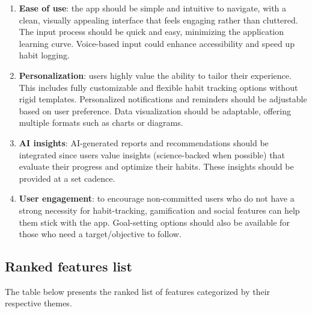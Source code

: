 \documentclass{article}
\begin{document}
\begin{enumerate}

    \item \textbf{Ease of use}: the app should be simple and intuitive to navigate, with a clean, visually appealing interface that feels engaging rather than cluttered. The input process should be quick and easy, minimizing the application learning curve. Voice-based input could enhance accessibility and speed up habit logging.

    \item \textbf{Personalization}: users highly value the ability to tailor their experience. This includes fully customizable and flexible habit tracking options without rigid templates. Personalized notifications and reminders should be adjustable based on user preference. Data visualization should be adaptable, offering multiple formats such as charts or diagrams.

    \item \textbf{AI insights}: AI-generated reports and recommendations should be integrated since users value insights (science-backed when possible) that evaluate their progress and optimize their habits. These insights should be provided at a set cadence.

    \item \textbf{User engagement}: to encourage non-committed users who do not have a strong necessity for habit-tracking, gamification and social features can help them stick with the app. Goal-setting options should also be available for those who need a target/objective to follow.

\end{enumerate}

\subsection{Ranked features list}

The table below presents the ranked list of features categorized by their respective themes.
\end{document}

